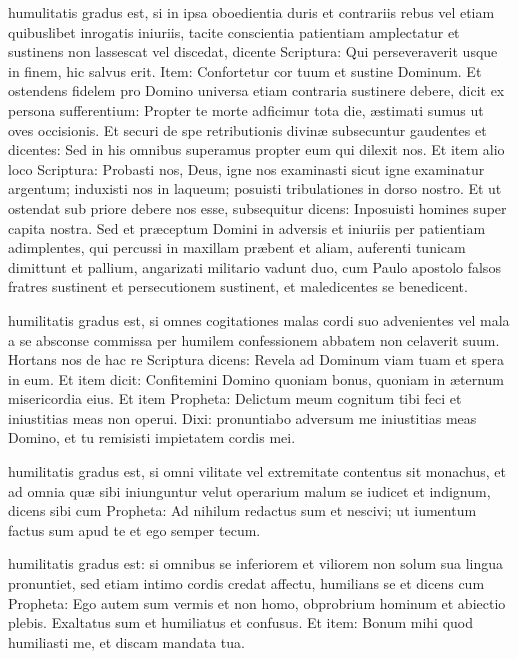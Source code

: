 \documentclass[fontsize=9pt,paper=A6,twoside,BCOR=1mm,DIV=22,headinclude]{scrarticle}
\begin{document}
\begin{multicols}{2}
 humulitatis gradus est, si in ipsa oboedientia duris et contrariis rebus vel etiam quibuslibet inrogatis iniuriis, tacite conscientia patientiam amplectatur et sustinens non lassescat vel discedat, dicente Scriptura: Qui perseveraverit usque in finem, hic salvus erit. Item: Confortetur cor tuum et sustine Dominum. Et ostendens fidelem pro Domino universa etiam contraria sustinere debere, dicit ex persona sufferentium: Propter te morte adficimur tota die, æstimati sumus ut oves occisionis. Et securi de spe retributionis divinæ subsecuntur gaudentes et dicentes: Sed in his omnibus superamus propter eum qui dilexit nos. Et item alio loco Scriptura: Probasti nos, Deus, igne nos examinasti sicut igne examinatur argentum; induxisti nos in laqueum; posuisti tribulationes in dorso nostro. Et ut ostendat sub priore debere nos esse, subsequitur dicens: Inposuisti homines super capita nostra. Sed et præceptum Domini in adversis et iniuriis per patientiam adimplentes, qui percussi in maxillam præbent et aliam, auferenti tunicam dimittunt et pallium, angarizati militario vadunt duo, cum Paulo apostolo falsos fratres sustinent et persecutionem sustinent, et maledicentes se benedicent.

 humilitatis gradus est, si omnes cogitationes malas cordi suo advenientes vel mala a se absconse commissa per humilem confessionem abbatem non celaverit suum. Hortans nos de hac re Scriptura dicens: Revela ad Dominum viam tuam et spera in eum. Et item dicit: Confitemini Domino quoniam bonus, quoniam in æternum misericordia eius. Et item Propheta: Delictum meum cognitum tibi feci et iniustitias meas non operui. Dixi: pronuntiabo adversum me iniustitias meas Domino, et tu remisisti impietatem cordis mei.

 humilitatis gradus est, si omni vilitate vel extremitate contentus sit monachus, et ad omnia quæ sibi iniunguntur velut operarium malum se iudicet et indignum, dicens sibi cum Propheta: Ad nihilum redactus sum et nescivi; ut iumentum factus sum apud te et ego semper tecum.

 humilitatis gradus est: si omnibus se inferiorem et viliorem non solum sua lingua pronuntiet, sed etiam intimo cordis credat affectu, humilians se et dicens cum Propheta: Ego autem sum vermis et non homo, obprobrium hominum et abiectio plebis. Exaltatus sum et humiliatus et confusus. Et item: Bonum mihi quod humiliasti me, et discam mandata tua.


\end{multicols}
\end{document}

